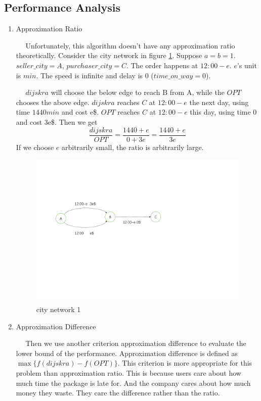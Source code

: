 \documentclass[11pt, a4paper]{article} %
\begin{document}
	\subsection{Performance Analysis}
	\begin{enumerate}
		\item Approximation Ratio\par
		$\quad$ Unfortunately, this algorithm doesn't have any approximation ratio theoretically. Consider the city network in figure \ref{fig:ct1}. Suppose $a=b=1$. $seller\_city=A$, $purchaser\_city=C$. The order happens at $12:00-e$. $e$'s unit is $min$. The speed is infinite and delay is 0 ($time\_on\_way=0$).
		
		$\quad$ $dijskra$ will choose the below edge to reach B from A, while the $OPT$ chooses the above edge. $dijskra$ reaches $C$ at $12:00-e$ the next day, using time $1440min$ and cost e\$. $OPT$ reaches $C$ at $12:00-e$ this day, using time $0$ and cost 3e\$. Then we get
		$$
		\frac{dijskra}{OPT}=\frac{1440+e}{0+3e}=\frac{1440+e}{3e}
		$$
		If we choose $e$ arbitrarily small, the ratio is arbitrarily large.
		\begin{figure}
			\centering
			\includegraphics[width=\textwidth]{figure/citynetwork1}
			\caption{city network 1}
			\label{fig:ct1}
		\end{figure}
		\item Approximation Difference\par
		$\quad$ Then we use another criterion approximation difference to evaluate the lower bound of the performance. Approximation difference is defined as $\max\{f(dijskra)-f(OPT)\}$. This criterion is more appropriate for this problem than approximation ratio. This is because users care about how much time the package is late for. And the company cares about how much money they waste. They care the difference rather than the ratio. 
		

\end{enumerate}
\end{document}
